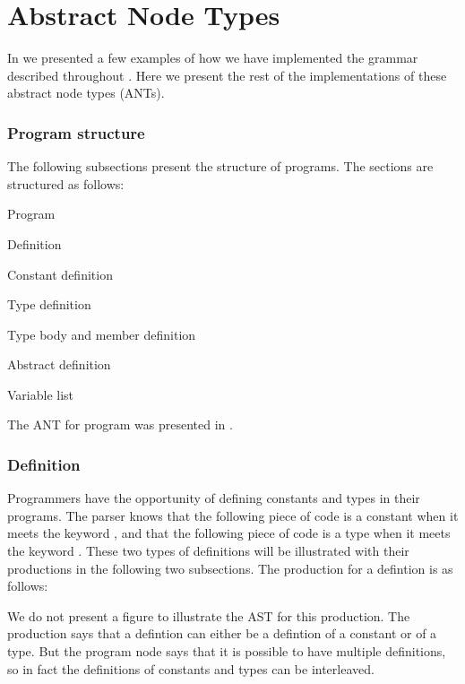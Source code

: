\chapter{Abstract Node Types}
\label{ap:ant}

In  we presented a few examples of how we have implemented the
grammar described throughout . Here we present the rest of the
implementations of these abstract node types (ANTs). 

\subsection{Program structure}
The following subsections present the structure of programs. The sections are 
structured as follows:

\begin{dlist}
  \item Program
  \item Definition
  \item Constant definition
  \item Type definition
  \item Type body and member definition
  \item Abstract definition
  \item Variable list
\end{dlist}

The ANT for program was presented in .

\subsection{Definition}
Programmers have the opportunity of defining constants and types in their
programs.  The parser knows that the following piece of code is a constant when
it meets the keyword , and that the following piece of code is a
type when it meets the keyword . These two types of definitions will
be illustrated with their productions in the following two subsections. The 
production for a defintion is as follows:

\begin{ebnf}
\end{ebnf}

We do not present a figure to illustrate the AST for this production. The
production says that a defintion can either be a defintion of a constant or of a
type. But the program node says that it is possible to have multiple
definitions, so in fact the definitions of constants and types can be
interleaved.

